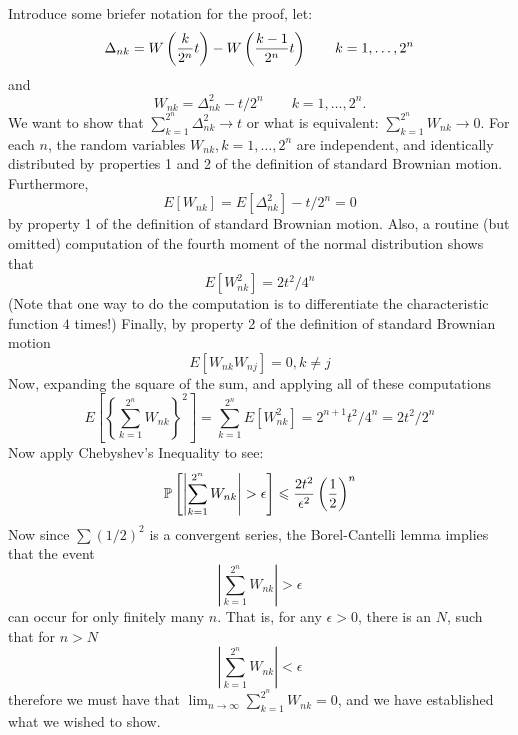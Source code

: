 \begin{solution}
\begin{solution}
\begin{solution}
\begin{solution}
\begin{solution}
\begin{solution}
\begin{solution}
\begin{solution}
\begin{solution}
\begin{solution}
{\begin{problem}
\end{problem} 
\begin{solution} 
  Introduce some briefer notation for the proof, let:
  \[
    \Dt_{nk} = 
                  W\left( \frac{k}{2^n} t \right) -
                  W\left( \frac{k-1}{2^n} t \right)
          \qquad k = 1, \ldots, 2^n
  \]
  and
  \[
    W_{nk} = \Delta^{2}_{nk} - t/2^n \qquad k = 1, \ldots, 2^n.
  \]
  We want to show that $\sum_{k=1}^{2^n} \Delta^2_{nk} \to t$ or what
  is equivalent: $\sum_{k=1}^{2^n} W_{nk} \to 0$.  For each $n$, the
  random variables $W_{nk}, k = 1, \ldots, 2^n$ are independent, and
  identically distributed by properties 1 and 2 of the definition of
  standard Brownian motion.  Furthermore,
  \[
    E[ W_{nk} ] = E[ \Delta_{nk}^2 ] - t/2^n = 0
  \]
  by property 1 of the definition of standard Brownian motion.  Also, a
 routine (but omitted) 
  computation of the fourth moment of the normal distribution
  shows that
  \[
    E[W^2_{nk} ] = 2t^2/4^n
  \]
  (Note that one way to do the computation is to differentiate the
  characteristic function $4$ times!)
  Finally, by property 2 of the definition of standard Brownian motion
  \[
    E[ W_{nk}W_{nj} ] = 0, k \ne j
  \]
  Now, expanding the square of the sum, and applying all of these
  computations
  $$
    E\left[ \left\{ \sum_{k=1}^{2^n} W_{nk} \right\}^2 \right] =
    \sum_{k=1}^{2^n} E[W^2_{nk}] = 2^{n+1}t^2/4^n = 2t^2/2^n
  $$
  Now apply Chebyshev's Inequality to see:
  $$
    \P\left[ \left| \sum_{k=1}^{2^n} W_{nk} \right| > \epsilon \right]
     \le \frac{2 t^2}{\epsilon^2} \left( \frac{1}{2}
    \right)^n
  $$
  Now since $\sum (1/2)^2$ is a convergent series, the Borel-Cantelli
  lemma implies that the event
  $$
    \left| \sum_{k=1}^{2^n} W_{nk} \right| > \epsilon
  $$
  can occur for only finitely many $n$.  That is, for any $\epsilon >
  0$, there is an $N$, such that for $n > N$
  $$
    \left| \sum_{k=1}^{2^n} W_{nk} \right| < \epsilon
  $$
  therefore we must have that 
  $\lim_{n \to \infty} \sum_{k=1}^{2^n} W_{nk} = 0$, 
  and we have established what we
  wished to show.
\end{solution}

}
\end{solution}
\end{solution}
\end{solution}
\end{solution}
\end{solution}
\end{solution}
\end{solution}
\end{solution}
\end{solution}
\end{solution}

